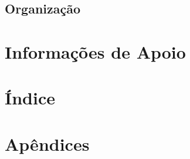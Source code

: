 \documentclass[12pt,a4paper,onecolumn,titlepage]{article}
\begin{document}
\subsection{Organização}
\section{Informações de Apoio}
\label{apoio}

\section{Índice}
\label{sect:indice}

\section{Apêndices}
\label{sect:apendices}

%
%
\end{document}
